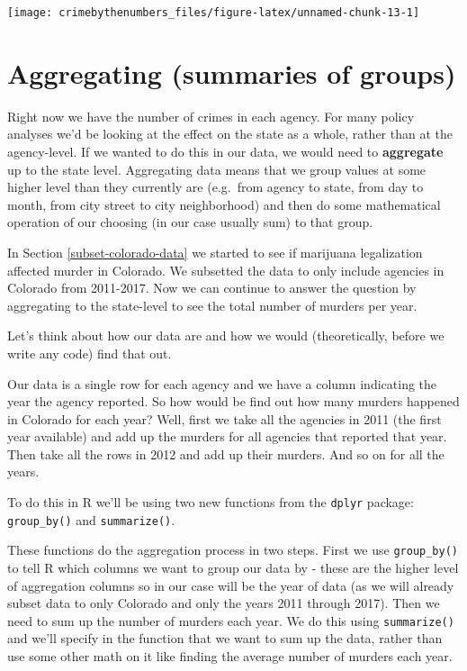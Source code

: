 \documentclass[
]{krantz}
\begin{document}
\begin{center}\texttt{[image: crimebythenumbers\_files/figure-latex/unnamed-chunk-13-1]} \end{center}

\hypertarget{aggregate}{%
\section{Aggregating (summaries of groups)}\label{aggregate}}

Right now we have the number of crimes in each agency. For many policy analyses we'd be looking at the effect on the state as a whole, rather than at the agency-level. If we wanted to do this in our data, we would need to \textbf{aggregate} up to the state level. Aggregating data means that we group values at some higher level than they currently are (e.g.~from agency to state, from day to month, from city street to city neighborhood) and then do some mathematical operation of our choosing (in our case usually sum) to that group.

In Section \ref{subset-colorado-data} we started to see if marijuana legalization affected murder in Colorado. We subsetted the data to only include agencies in Colorado from 2011-2017. Now we can continue to answer the question by aggregating to the state-level to see the total number of murders per year.

Let's think about how our data are and how we would (theoretically, before we write any code) find that out.

Our data is a single row for each agency and we have a column indicating the year the agency reported. So how would be find out how many murders happened in Colorado for each year? Well, first we take all the agencies in 2011 (the first year available) and add up the murders for all agencies that reported that year. Then take all the rows in 2012 and add up their murders. And so on for all the years.

To do this in R we'll be using two new functions from the \texttt{dplyr} package: \texttt{group\_by()} and \texttt{summarize()}.

These functions do the aggregation process in two steps. First we use \texttt{group\_by()} to tell R which columns we want to group our data by - these are the higher level of aggregation columns so in our case will be the year of data (as we will already subset data to only Colorado and only the years 2011 through 2017). Then we need to sum up the number of murders each year. We do this using \texttt{summarize()} and we'll specify in the function that we want to sum up the data, rather than use some other math on it like finding the average number of murders each year.
\end{document}
